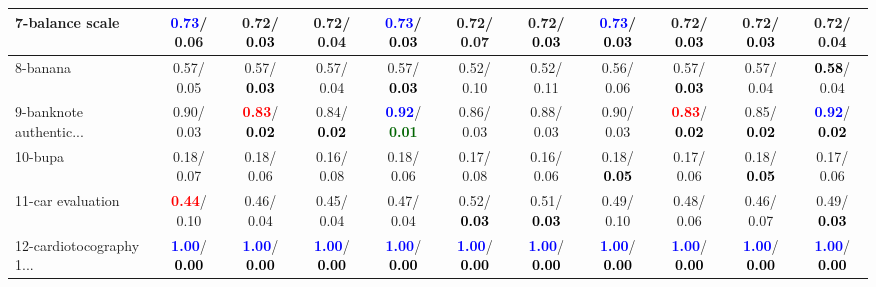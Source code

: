 \begin{table}[h]
\begin{center}
{\begin{tabular}{lc|c|c|c|c|c|c|c|c|c}
7-balance scale & \textcolor{blue}{\textbf{  0.73}}/  0.06 &   0.72/\textcolor{black}{\textbf{  0.03}} &   0.72/  0.04 & \textcolor{blue}{\textbf{  0.73}}/\textcolor{black}{\textbf{  0.03}} &   0.72/  0.07 &   0.72/\textcolor{black}{\textbf{  0.03}} & \textcolor{blue}{\textbf{  0.73}}/\textcolor{black}{\textbf{  0.03}} &   0.72/\textcolor{black}{\textbf{  0.03}} &   0.72/\textcolor{black}{\textbf{  0.03}} &   0.72/  0.04 \\ \hline
8-banana &   0.57/  0.05 &   0.57/\textcolor{black}{\textbf{  0.03}} &   0.57/  0.04 &   0.57/\textcolor{black}{\textbf{  0.03}} &   0.52/  0.10 &   0.52/  0.11 &   0.56/  0.06 &   0.57/\textcolor{black}{\textbf{  0.03}} &   0.57/  0.04 & \textcolor{black}{\textbf{  0.58}}/  0.04 \\
9-banknote authentic... &   0.90/  0.03 & \textcolor{red}{\textbf{  0.83}}/\textcolor{black}{\textbf{  0.02}} &   0.84/\textcolor{black}{\textbf{  0.02}} & \textcolor{blue}{\textbf{  0.92}}/\textcolor{darkgreen}{\textbf{  0.01}} &   0.86/  0.03 &   0.88/  0.03 &   0.90/  0.03 & \textcolor{red}{\textbf{  0.83}}/\textcolor{black}{\textbf{  0.02}} &   0.85/\textcolor{black}{\textbf{  0.02}} & \textcolor{blue}{\textbf{  0.92}}/\textcolor{black}{\textbf{  0.02}} \\
10-bupa &   0.18/  0.07 &   0.18/  0.06 &   0.16/  0.08 &   0.18/  0.06 &   0.17/  0.08 &   0.16/  0.06 &   0.18/\textcolor{black}{\textbf{  0.05}} &   0.17/  0.06 &   0.18/\textcolor{black}{\textbf{  0.05}} &   0.17/  0.06 \\
11-car evaluation & \textcolor{red}{\textbf{  0.44}}/  0.10 &   0.46/  0.04 &   0.45/  0.04 &   0.47/  0.04 &   0.52/\textcolor{black}{\textbf{  0.03}} &   0.51/\textcolor{black}{\textbf{  0.03}} &   0.49/  0.10 &   0.48/  0.06 &   0.46/  0.07 &   0.49/\textcolor{black}{\textbf{  0.03}} \\
12-cardiotocography 1... & \textcolor{blue}{\textbf{  1.00}}/\textcolor{black}{\textbf{  0.00}} & \textcolor{blue}{\textbf{  1.00}}/\textcolor{black}{\textbf{  0.00}} & \textcolor{blue}{\textbf{  1.00}}/\textcolor{black}{\textbf{  0.00}} & \textcolor{blue}{\textbf{  1.00}}/\textcolor{black}{\textbf{  0.00}} & \textcolor{blue}{\textbf{  1.00}}/\textcolor{black}{\textbf{  0.00}} & \textcolor{blue}{\textbf{  1.00}}/\textcolor{black}{\textbf{  0.00}} & \textcolor{blue}{\textbf{  1.00}}/\textcolor{black}{\textbf{  0.00}} & \textcolor{blue}{\textbf{  1.00}}/\textcolor{black}{\textbf{  0.00}} & \textcolor{blue}{\textbf{  1.00}}/\textcolor{black}{\textbf{  0.00}} & \textcolor{blue}{\textbf{  1.00}}/\textcolor{black}{\textbf{  0.00}} \\

\end{tabular}}
\end{center}
\end{table}
